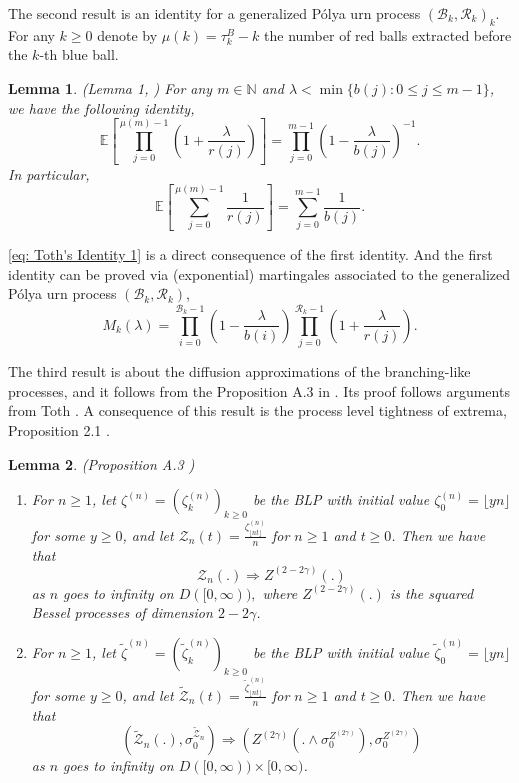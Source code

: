 \documentclass[twoside,12pt,a4paper]{article}
\newtheorem{lemma}{Lemma}[section]
\numberwithin{equation}{section}
\begin{document}
		The second result is an identity for a generalized P\'{o}lya urn process $(\mathcal{B}_{k},\mathcal{R}_{k})_k$. For any $k\geq 0$ denote by $\mu(k)= \tau^B_k - k$ the number of red balls extracted before the $k$-th blue ball. 
		\begin{lemma}(Lemma 1, \cite{T96}) \label{lm: Toth's Identity}
			For any $m\in \mathbb{N}$ and $\lambda < \min\{ b(j): 0\leq j\leq m-1 \}$, we have the following identity,
			$$  \mathbb{E}\left[  \prod_{j=0}^{ \mu(m)-1 } \left(1+ \frac{\lambda}{r(j)}   \right) \right] =   \prod_{j=0}^{ m-1 } \left(1- \frac{\lambda}{b(j)}   \right)^{-1}.   $$ 
			In particular, 
			\begin{equation}\label{eq: Toth's Identity 1}
				\mathbb{E}\left[  \sum_{j=0}^{ \mu(m)-1 } \frac{1}{r(j)}   \right] =   \sum_{j=0}^{ m-1 } \frac{1}{b(j)}.
			\end{equation}	
		\end{lemma}
		\eqref{eq: Toth's Identity 1} is a direct consequence of the first identity. And the first identity can be proved via (exponential) martingales associated to the generalized P\'{o}lya urn process $(\mathcal{B}_{k},\mathcal{R}_{k})$, 
		$$M_k(\lambda) = \prod_{i=0}^{ \mathcal{B}_{k}-1 } \left(1-\frac{\lambda}{b(i)}\right) \prod_{j=0}^{\mathcal{R}_{k}-1 } \left(1+\frac{\lambda}{r(j)}\right). $$
		
		The third result is about the diffusion approximations of the branching-like processes, and it follows from the Proposition A.3 in \cite{KMP22}. Its proof follows arguments from Toth \cite{T96}. A consequence of this result is the process level tightness of extrema, Proposition 2.1 \cite{KMP22}. 
		
		\begin{lemma}(Proposition A.3 \cite{KMP22})\label{lm: diffusion approximation of blp}
			\begin{enumerate}
				\item 
			For $n\geq 1$, let $\zeta^{(n)}=(\zeta^{(n)}_k)_{k\geq 0 }  $ be the BLP with initial value $\zeta^{(n)}_0 = \lfloor yn \rfloor$ for some $y \geq 0$, and let $\mathcal{Z}_n(t) = \frac{\zeta^{(n)}_{\lfloor nt \rfloor}}{n}$ for $n\geq 1$ and $t\geq 0$. Then we have that 
			$$
			\mathcal{Z}_n(.) \Longrightarrow Z^{(2-2\gamma)}(.)
			$$ as $n$ goes to infinity on $D([0,\infty)),$ where $Z^{(2-2\gamma)}(.)$ is the squared Bessel processes of dimension $2-2\gamma$.

			\item
				For $n\geq 1$, let $\tilde\zeta^{(n)}=(\tilde\zeta^{(n)}_k)_{k\geq 0 }  $ be the BLP with initial value $\tilde\zeta^{(n)}_0 = \lfloor yn \rfloor$ for some $y \geq 0$, and let $\tilde{\mathcal{Z}}_n(t) = \frac{\tilde\zeta^{(n)}_{\lfloor nt \rfloor}}{n}$ for $n\geq 1$ and $t\geq 0$. Then we have that 
			$$
			\left(\tilde{\mathcal{Z}}_n(.), \sigma_0^{\tilde{\mathcal{Z}}_n}\right) 
			\Longrightarrow \left(Z^{(2\gamma)}(. \wedge \sigma_0^{Z^{(2 \gamma)}}), \sigma_0^{Z^{(2 \gamma)}}\right)
			$$ as $n$ goes to infinity on $D([0,\infty)) \times [0,\infty )$.
			\end{enumerate}

		
		\end{lemma}
\end{document}
